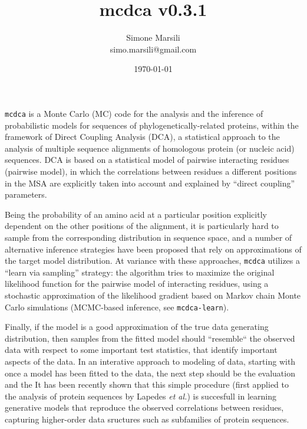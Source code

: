 \documentclass[a4paper,onecolumn]{article}
\title{
  mcdca v0.3.1
}
\author{
        Simone Marsili \\
        simo.marsili@gmail.com
}
\date{\today}
\begin{document}
\maketitle
\verb|mcdca| is a Monte Carlo (MC) code for the analysis and the inference of probabilistic models for sequences of phylogenetically-related proteins, 
within the framework of Direct Coupling Analysis (DCA)\cite{wikipedia2016Direct_coupling_analysis},
a statistical approach to the analysis of multiple sequence alignments of homologous protein (or nucleic acid) sequences.
DCA is based on a statistical model of pairwise interacting residues (pairwise model),
in which the correlations between residues a different positions in the MSA
are explicitly taken into account and explained by ``direct coupling'' parameters\cite{lapedes2002using,weigt2009identification,morcos2011direct}.

Being the probability of an amino acid at a particular position explicitly dependent on the other positions of the alignment,
it is particularly hard to sample from the corresponding distribution in sequence space, and a number of alternative inference strategies have been proposed that rely
on approximations of the target model distribution\cite{burger2010disentangling,morcos2011direct,balakrishnan2011learning,jones2012psicov,ekeberg2013improved}. 
At variance with these approaches, \verb|mcdca| utilizes a ``learn via sampling'' strategy:
the algorithm tries to maximize the original likelihood function for the pairwise model of interacting residues, 
using a stochastic approximation of the likelihood gradient based on Markov chain Monte Carlo simulations (MCMC-based inference, see \verb|mcdca-learn|).

Finally, if the model is a good approximation of the true data generating distribution, then samples from the fitted model should ``resemble`` the observed data with respect to some important test statistics, that identify important aspects of the data\cite{linderman2017using}. 
In an interative approach to modeling of data, starting with once a model has been fitted to the data, the next step should be the evaluation and the 
It has been recently shown\cite{sutto2015residue} that this simple procedure\cite{ackley1985learning,hinton1986learning} (first applied to the analysis of protein sequences by Lapedes {\it et al.}\cite{lapedes2002using}) is succesfull in learning generative models that reproduce the observed correlations between residues,
capturing higher-order data sructures such as subfamilies of protein sequences\cite{sutto2015residue}.
\end{document}

